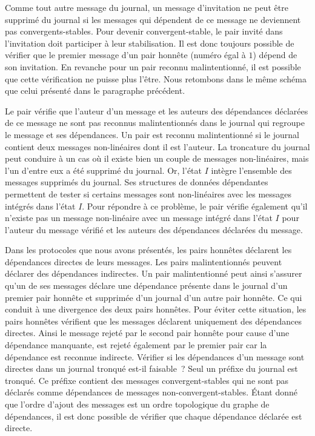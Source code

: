 Comme tout autre message du journal, un message d'invitation ne peut être supprimé du journal si les messages qui dépendent de ce message ne deviennent pas convergents-stables.
Pour devenir convergent-stable, le pair invité dans l'invitation doit participer à leur stabilisation.
Il est donc toujours possible de vérifier que le premier message d'un pair honnête (numéro égal à $1$) dépend de son invitation.
En revanche pour un pair reconnu malintentionné, il est possible que cette vérification ne puisse plus l'être.
Nous retombons dans le même schéma que celui présenté dans le paragraphe précédent.

Le pair vérifie que l'auteur d'un message et les auteurs des dépendances déclarées de ce message ne sont pas reconnus malintentionnés dans le journal qui regroupe le message et ses dépendances.
Un pair est reconnu malintentionné si le journal contient deux messages non-linéaires dont il est l'auteur.
La troncature du journal peut conduire à un cas où il existe bien un couple de messages non-linéaires, mais l'un d'entre eux a été supprimé du journal.
Or, l'état $I$ intègre l'ensemble des messages supprimés du journal.
Ses structures de données dépendantes permettent de tester si certains messages sont non-linéaires avec les messages intégrés dans l'état $I$.
Pour répondre à ce problème, le pair vérifie également qu'il n'existe pas un message non-linéaire avec un message intégré dans l'état $I$ pour l'auteur du message vérifié et les auteurs des dépendances déclarées du message.

Dans les protocoles que nous avons présentés, les pairs honnêtes déclarent les dépendances directes de leurs messages.
Les pairs malintentionnés peuvent déclarer des dépendances indirectes.
Un pair malintentionné peut ainsi s'assurer qu'un de ses messages déclare une dépendance présente dans le journal d'un premier pair honnête et supprimée d'un journal d'un autre pair honnête.
Ce qui conduit à une divergence des deux pairs honnêtes.
Pour éviter cette situation, les pairs honnêtes vérifient que les messages déclarent uniquement des dépendances directes.
Ainsi le message rejeté par le second pair honnête pour cause d'une dépendance manquante, est rejeté également par le premier pair car la dépendance est reconnue indirecte.
Vérifier si les dépendances d'un message sont directes dans un journal tronqué est-il faisable~?
Seul un préfixe du journal est tronqué.
Ce préfixe contient des messages convergent-stables qui ne sont pas déclarés comme dépendances de messages non-convergent-stables.
Étant donné que l'ordre d'ajout des messages est un ordre topologique du graphe de dépendances, il est donc possible de vérifier que chaque dépendance déclarée est directe.


